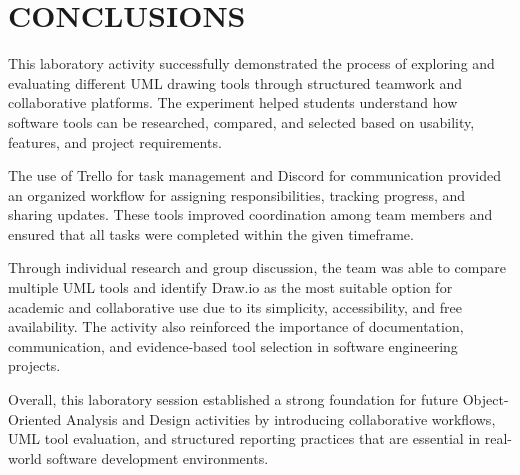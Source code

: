 \chapter{CONCLUSIONS}
\label{ch:conclusions}

This laboratory activity successfully demonstrated the process of exploring and evaluating different UML drawing tools through structured teamwork and collaborative platforms. The experiment helped students understand how software tools can be researched, compared, and selected based on usability, features, and project requirements.

The use of Trello for task management and Discord for communication provided an organized workflow for assigning responsibilities, tracking progress, and sharing updates. These tools improved coordination among team members and ensured that all tasks were completed within the given timeframe.

Through individual research and group discussion, the team was able to compare multiple UML tools and identify Draw.io as the most suitable option for academic and collaborative use due to its simplicity, accessibility, and free availability. The activity also reinforced the importance of documentation, communication, and evidence-based tool selection in software engineering projects.

Overall, this laboratory session established a strong foundation for future Object-Oriented Analysis and Design activities by introducing collaborative workflows, UML tool evaluation, and structured reporting practices that are essential in real-world software development environments.
